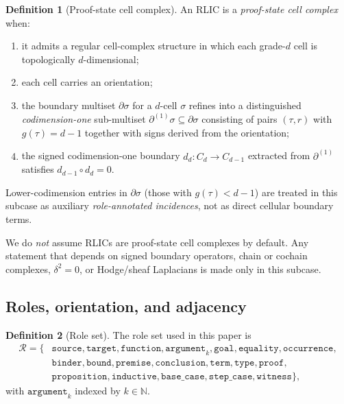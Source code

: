 \documentclass[11pt]{article}
\theoremstyle{definition}
\newtheorem{definition}{Definition}[section]
\theoremstyle{plain}
\newcommand{\N}{\mathbb{N}}
\newcommand{\role}[1]{\texttt{#1}}
\begin{document}
\begin{definition}[Proof-state cell complex]\label{def:pscc}
An RLIC is a \emph{proof-state cell complex} when:
\begin{enumerate}[label=(\roman*)]
\item it admits a regular cell-complex structure in which each grade-$d$ cell is topologically $d$-dimensional;
\item each cell carries an orientation;
\item the boundary multiset $\partial \sigma$ for a $d$-cell $\sigma$ refines into a distinguished \emph{codimension-one} sub-multiset $\partial^{(1)} \sigma \subseteq \partial \sigma$ consisting of pairs $(\tau, r)$ with $g(\tau) = d - 1$ together with signs derived from the orientation;
\item the signed codimension-one boundary $d_d\colon C_d \to C_{d-1}$ extracted from $\partial^{(1)}$ satisfies $d_{d-1} \circ d_d = 0$.
\end{enumerate}
Lower-codimension entries in $\partial \sigma$ (those with $g(\tau) < d - 1$) are treated in this subcase as auxiliary \emph{role-annotated incidences}, not as direct cellular boundary terms.
\end{definition}

We do \emph{not} assume RLICs are proof-state cell complexes by default. Any statement that depends on signed boundary operators, chain or cochain complexes, $\delta^2 = 0$, or Hodge/sheaf Laplacians is made only in this subcase.

\subsection{Roles, orientation, and adjacency}

\begin{definition}[Role set]\label{def:roles}
The role set used in this paper is
\begin{align*}
\mathcal{R} = \{ & \role{source}, \role{target}, \role{function}, \role{argument}_k, \role{goal}, \role{equality}, \role{occurrence},\\
& \role{binder}, \role{bound}, \role{premise}, \role{conclusion}, \role{term}, \role{type}, \role{proof},\\
& \role{proposition}, \role{inductive}, \role{base\_case}, \role{step\_case}, \role{witness} \},
\end{align*}
with $\role{argument}_k$ indexed by $k \in \N$.
\end{definition}
\end{document}
